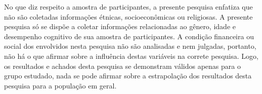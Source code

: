 No que diz respeito a amostra de participantes, a presente pesquisa enfatiza que não são coletadas informações étnicas, socioeconômicas ou religiosas. A presente pesquisa só se dispõe a coletar informações relacionadas ao gênero, idade e desempenho cognitivo de sua amostra de participantes. A condição financeira ou social dos envolvidos nesta pesquisa não são analisadas e nem julgadas, portanto, não há o que afirmar sobre a influência destas variáveis na correte pesquisa. Logo, os resultados e achados desta pesquisa se demonstram válidos apenas para o grupo estudado, nada se pode afirmar sobre a estrapolação dos resultados desta pesquisa para a população em geral. 




